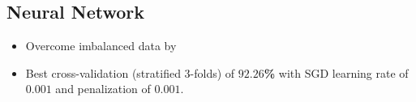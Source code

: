 \documentclass[c]{beamer}
\begin{document}
\subsection{Neural Network}

\begin{frame}
\begin{itemize}
 \item Overcome imbalanced data by 
 \end{itemize}
 \begin{itemize}
  \item Best cross-validation (stratified 3-folds) of \textbf{$92.26$\%} with SGD learning rate of $0.001$ and penalization of $0.001$. 
 \end{itemize}
\end{frame}
\end{document}
